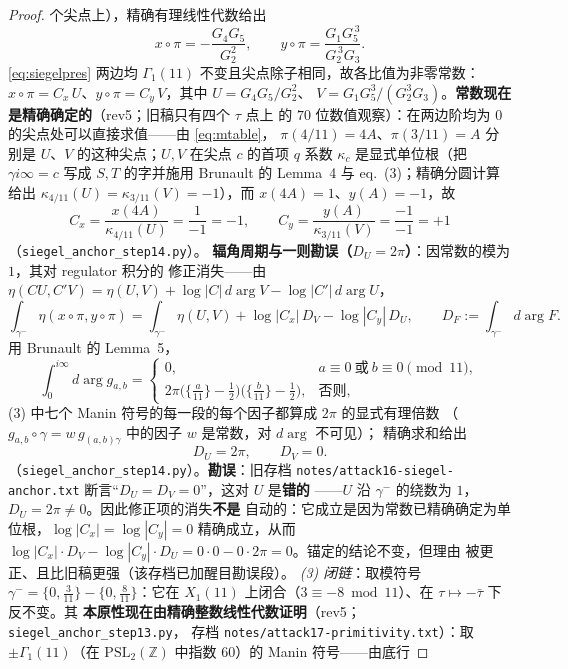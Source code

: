 \documentclass[11pt,a4paper]{ctexart}
\theoremstyle{remark}
\newcommand{\ZZ}{\mathbb{Z}}
\begin{document}
\begin{proof}
个尖点上），精确有理线性代数给出
\[
x\circ\pi=-\frac{G_4G_5}{G_2^2},\qquad
y\circ\pi=\frac{G_1G_5^{\,3}}{G_2^{\,3}G_3}.\tag{P}\label{eq:siegelpres}
\]
\eqref{eq:siegelpres} 两边均 $\Gamma_1(11)$ 不变且尖点除子相同，故各比值为非零常数：
$x\circ\pi=C_x\,U$、$y\circ\pi=C_y\,V$，其中 $U=G_4G_5/G_2^2$、
$V=G_1G_5^3/(G_2^3G_3)$。\textbf{常数现在是精确确定的}（rev5；旧稿只有四个 $\tau$ 点上
的 $70$ 位数值观察）：在两边阶均为 $0$ 的尖点处可以直接求值——由 \eqref{eq:mtable}，
$\pi(4/11)=4A$、$\pi(3/11)=A$ 分别是 $U$、$V$ 的这种尖点；$U,V$ 在尖点 $c$ 的首项
$q$ 系数 $\kappa_c$ 是显式单位根（把 $\gamma i\infty=c$ 写成 $S,T$ 的字并施用
Brunault 的 Lemma~4 与 eq.~(3)；精确分圆计算给出
$\kappa_{4/11}(U)=\kappa_{3/11}(V)=-1$），而 $x(4A)=1$、$y(A)=-1$，故
\[
C_x=\frac{x(4A)}{\kappa_{4/11}(U)}=\frac{1}{-1}=-1,\qquad
C_y=\frac{y(A)}{\kappa_{3/11}(V)}=\frac{-1}{-1}=+1
\]
（\texttt{siegel\_anchor\_step14.py}）。
\textbf{辐角周期与一则勘误（$D_U=2\pi$）}：因常数的模为 $1$，其对 regulator 积分的
修正消失——由
$\eta(CU,C'V)=\eta(U,V)+\log|C|\,d\!\arg V-\log|C'|\,d\!\arg U$，
\[
\int_{\gamma^-}\eta(x\circ\pi,y\circ\pi)=\int_{\gamma^-}\eta(U,V)
+\log|C_x|\,D_V-\log|C_y|\,D_U,\qquad
D_F:=\int_{\gamma^-}d\!\arg F.
\]
用 Brunault 的 Lemma~5，
\[
\int_0^{i\infty}d\!\arg g_{a,b}=
\begin{cases}
0,&a\equiv0\ \text{或}\ b\equiv0\pmod{11},\\[1mm]
2\pi\bigl(\{\tfrac{a}{11}\}-\tfrac12\bigr)
 \bigl(\{\tfrac{b}{11}\}-\tfrac12\bigr),&\text{否则},
\end{cases}
\]
(3) 中七个 Manin 符号的每一段的每个因子都算成 $2\pi$ 的显式有理倍数
（$g_{a,b}\circ\gamma=w\,g_{(a,b)\gamma}$ 中的因子 $w$ 是常数，对 $d\arg$ 不可见）；
精确求和给出
\[
D_U=2\pi,\qquad D_V=0.\tag{D}\label{eq:DUDV}
\]
（\texttt{siegel\_anchor\_step14.py}）。\textbf{勘误}：旧存档
\texttt{notes/attack16-siegel-anchor.txt} 断言``$D_U=D_V=0$''，这对 $U$ 是\textbf{错的}
——$U$ 沿 $\gamma^-$ 的绕数为 $1$，$D_U=2\pi\neq0$。因此修正项的消失\textbf{不是}
自动的：它成立是因为常数已精确确定为单位根，$\log|C_x|=\log|C_y|=0$ 精确成立，从而
$\log|C_x|\cdot D_V-\log|C_y|\cdot D_U=0\cdot0-0\cdot2\pi=0$。锚定的结论不变，但理由
被更正、且比旧稿更强（该存档已加醒目勘误段）。
\emph{(3) 闭链}：取模符号 $\gamma^-=\{0,\tfrac{3}{11}\}-\{0,\tfrac{8}{11}\}$：它在
$X_1(11)$ 上闭合（$3\equiv-8\bmod 11$）、在 $\tau\mapsto-\bar\tau$ 下反不变。其
\textbf{本原性现在由精确整数线性代数证明}（rev5；\texttt{siegel\_anchor\_step13.py}，
存档 \texttt{notes/attack17-primitivity.txt}）：取 $\pm\Gamma_1(11)$（在
$\mathrm{PSL}_2(\ZZ)$ 中指数 $60$）的 Manin 符号——由底行

\end{proof}
\end{document}
